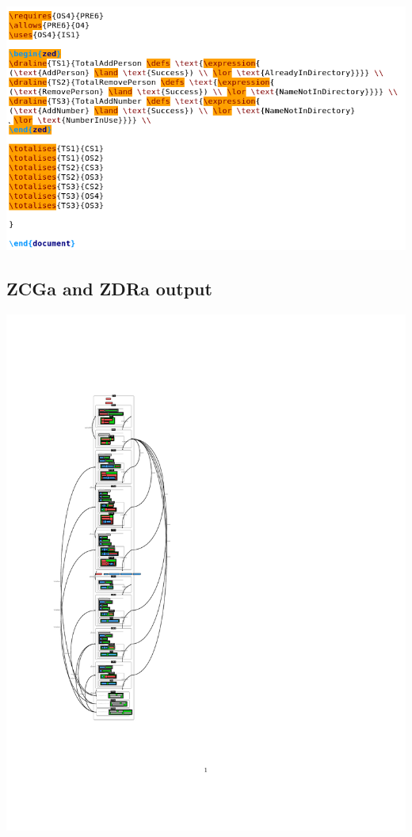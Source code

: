 \noindent \includegraphics[scale=0.5]{examples/nonworkzcga/1n2imageg.png}

\subsection{ZCGa and ZDRa output}
\noindent \includegraphics[clip, trim=0cm 4cm 6cm 4.2cm]{examples/nonworkzcga/1n2.pdf}

